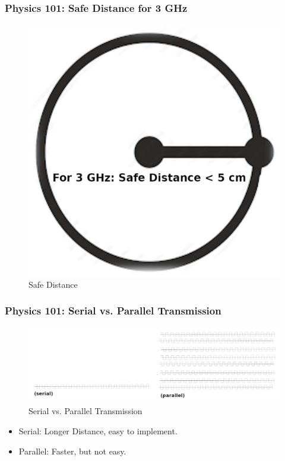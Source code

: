 \documentclass[xcolor=table, notheorems, hyperref={pdfpagelabels=false}]{beamer}
\begin{document}
\begin{frame}
\frametitle{Physics 101: Safe Distance for 3 GHz}
\begin{figure}
\includegraphics[width=0.50\linewidth]{os-circle}
\caption{Safe Distance}
\end{figure}
\end{frame}

\begin{frame}
\frametitle{Physics 101: Serial vs. Parallel Transmission}
\begin{figure}
\includegraphics[width=0.65\linewidth]{os-wave4}
\caption{Serial vs. Parallel Transmission}
\end{figure}
\begin{itemize}
\item Serial: Longer Distance, easy to implement.
\item Parallel: Faster, but not easy.
\end{itemize}
\end{frame}
\end{document}
